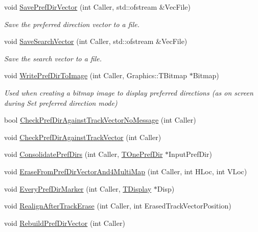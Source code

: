 \begin{DoxyCompactItemize}
\item 
\mbox{\label{class_t_one_pref_dir_a3d115535b2e2d2ea05e210997a3f525c}} 
void \mbox{\hyperlink{class_t_one_pref_dir_a3d115535b2e2d2ea05e210997a3f525c}{Save\+Pref\+Dir\+Vector}} (int Caller, std\+::ofstream \&Vec\+File)
\begin{DoxyCompactList}\small\item\em Save the preferred direction vector to a file. \end{DoxyCompactList}\item 
\mbox{\label{class_t_one_pref_dir_a8871c609a1586aa9c4f723afaccd2502}} 
void \mbox{\hyperlink{class_t_one_pref_dir_a8871c609a1586aa9c4f723afaccd2502}{Save\+Search\+Vector}} (int Caller, std\+::ofstream \&Vec\+File)
\begin{DoxyCompactList}\small\item\em Save the search vector to a file. \end{DoxyCompactList}\item 
\mbox{\label{class_t_one_pref_dir_af87440e0ace47b20c8a874c51b314064}} 
void \mbox{\hyperlink{class_t_one_pref_dir_af87440e0ace47b20c8a874c51b314064}{Write\+Pref\+Dir\+To\+Image}} (int Caller, Graphics\+::\+T\+Bitmap $\ast$Bitmap)
\begin{DoxyCompactList}\small\item\em Used when creating a bitmap image to display preferred directions (as on screen during \textquotesingle{}Set preferred direction\textquotesingle{} mode) \end{DoxyCompactList}\item 
bool \mbox{\hyperlink{class_t_one_pref_dir_ab8c8ad293f45948986903a05302b2dc8}{Check\+Pref\+Dir\+Against\+Track\+Vector\+No\+Message}} (int Caller)
\item 
void \mbox{\hyperlink{class_t_one_pref_dir_ab79dc3f93a471d2182ce625fcac1ff2d}{Check\+Pref\+Dir\+Against\+Track\+Vector}} (int Caller)
\item 
void \mbox{\hyperlink{class_t_one_pref_dir_a65df51092983945e1fe3c20bf8917a39}{Consolidate\+Pref\+Dirs}} (int Caller, \mbox{\hyperlink{class_t_one_pref_dir}{T\+One\+Pref\+Dir}} $\ast$Input\+Pref\+Dir)
\item 
void \mbox{\hyperlink{class_t_one_pref_dir_a8042c0e2fd7f9e39c3ca2a7bff7c68a4}{Erase\+From\+Pref\+Dir\+Vector\+And4\+Multi\+Map}} (int Caller, int H\+Loc, int V\+Loc)
\item 
void \mbox{\hyperlink{class_t_one_pref_dir_a9b425a3ed8ef998e2366d13ad52bf08c}{Every\+Pref\+Dir\+Marker}} (int Caller, \mbox{\hyperlink{class_t_display}{T\+Display}} $\ast$Disp)
\item 
void \mbox{\hyperlink{class_t_one_pref_dir_ab5bb3791670fd04645faf4ab1f2a5781}{Realign\+After\+Track\+Erase}} (int Caller, int Erased\+Track\+Vector\+Position)
\item 
void \mbox{\hyperlink{class_t_one_pref_dir_a1e62c2571d3629a067e1071086de72de}{Rebuild\+Pref\+Dir\+Vector}} (int Caller)
\end{DoxyCompactItemize}
